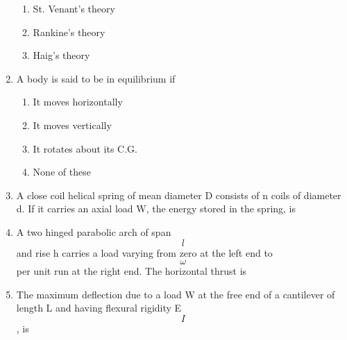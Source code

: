 \documentclass[11pt,a4paper]{article}
\begin{document}
\begin{enumerate}
\begin{enumerate}[label=\Alph*.]
\item{St. Venant's theory}
\item{Rankine's theory}
\item{Haig's theory}
\end{enumerate}
\item{A body is said to be in equilibrium if}
\begin{enumerate}[label=\Alph*.]
\item{It moves horizontally}
\item{It moves vertically}
\item{It rotates about its C.G.}
\item{None of these}
\end{enumerate}
\item{A close coil helical spring of mean diameter D consists of n coils of diameter d. If it carries an axial load W, the energy stored in the spring, is}
\\
\item{A two hinged parabolic arch of span $$l$$ and rise h carries a load varying from zero at the left end to $$\omega $$ per unit run at the right end. The horizontal thrust is}
\\
\item{The maximum deflection due to a load W at the free end of a cantilever of length L and having flexural rigidity E$$I$$, is}
\\\begin{enumerate*}[itemjoin=\qquad, label=\Alph*.]

\end{enumerate*}
\end{enumerate}
\end{document}
